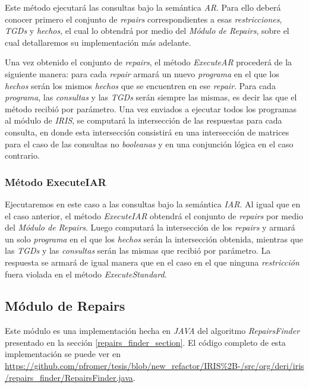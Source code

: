 \documentclass[11pt,a4paper,twoside]{tesis}
\begin{document}
Este método ejecutará las consultas bajo la semántica \textit{AR}. Para ello deberá conocer primero el conjunto de \textit{repairs} correspondientes a esas \textit{restricciones}, \textit{TGDs} y \textit{hechos}, el cual lo obtendrá por medio del \textit{Módulo de Repairs}, sobre el cual detallaremos su implementación más adelante. 

Una vez obtenido el conjunto de \textit{repairs}, el método \textit{ExecuteAR} procederá de la siguiente manera: para cada \textit{repair} armará un nuevo \textit{programa} en el que los \textit{hechos} serán los mismos \textit{hechos} que se encuentren en ese \textit{repair}. Para cada \textit{programa}, las \textit{consultas} y las \textit{TGDs} serán siempre las mismas, es decir las que el método recibió por parámetro. Una vez enviados a ejecutar todos los programas al módulo de \textit{IRIS}, se computará la intersección de las respuestas para cada consulta, en donde esta intersección consistirá en una intersección de matrices para el caso de las consultas no \textit{booleanas} y en una conjunción lógica en el caso contrario.

\subsubsection{Método ExecuteIAR}

Ejecutaremos en este caso a las consultas bajo la semántica \textit{IAR}. Al igual que en el caso anterior, el método \textit{ExecuteIAR} obtendrá el conjunto de \textit{repairs} por medio del \textit{Módulo de Repairs}. Luego computará la intersección de los \textit{repairs} y armará un solo \textit{programa} en el que los \textit{hechos} serán la intersección obtenida, mientras que las \textit{TGDs} y las \textit{consultas} serán las mismas que recibió por parámetro. La respuesta se armará de igual manera que en el caso en el que ninguna \textit{restricción} fuera violada en el método  \textit{ExecuteStandard}.

\subsection{Módulo de Repairs}\label{modulo_de_repairs}

Este módulo es una implementación hecha en \textit{JAVA} del algoritmo \textit{RepairsFinder} presentado en la sección \ref{repairs_finder_section}. El código completo de esta implementación se puede ver en \url{https://github.com/pfromer/tesis/blob/new_refactor/IRIS%2B-/src/org/deri/iris/repairs_finder/RepairsFinder.java}.
\end{document}
